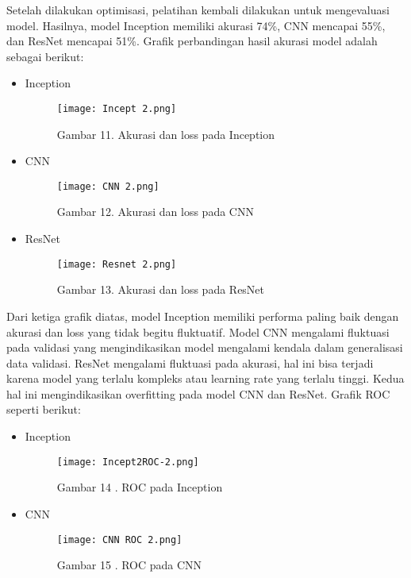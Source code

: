 \documentclass[12pt,a4paper]{article}
\begin{document}
Setelah dilakukan optimisasi, pelatihan kembali dilakukan untuk mengevaluasi model. Hasilnya, model Inception memiliki akurasi 74\%, CNN mencapai 55\%, dan ResNet mencapai 51\%. Grafik perbandingan hasil akurasi model adalah sebagai berikut:
\begin{itemize}
    \item Inception
    \begin{figure}[H]
        \centering
       \texttt{[image: Incept 2.png]}
        \caption*{Gambar 11. Akurasi dan loss pada Inception}
        \label{fig:enter-label}
    \end{figure}
\end{itemize}
\begin{itemize}
    \item CNN
    \begin{figure}[H]
        \centering
       \texttt{[image: CNN 2.png]}
        \caption*{Gambar 12. Akurasi dan loss pada CNN}
        \label{fig:enter-label}
    \end{figure}
\end{itemize}
\begin{itemize}
    \item ResNet
    \begin{figure}[H]
        \centering
       \texttt{[image: Resnet 2.png]}
        \caption*{Gambar 13. Akurasi dan loss pada ResNet}
        \label{fig:enter-label}
    \end{figure}
\end{itemize}
Dari ketiga grafik diatas, model Inception memiliki performa paling baik dengan akurasi dan loss yang tidak begitu fluktuatif. Model CNN mengalami fluktuasi pada validasi yang mengindikasikan model mengalami kendala dalam generalisasi data validasi. ResNet mengalami fluktuasi pada akurasi, hal ini bisa terjadi karena model yang terlalu kompleks atau learning rate yang terlalu tinggi. Kedua hal ini mengindikasikan overfitting pada model CNN dan ResNet.
Grafik ROC seperti berikut:
\begin{itemize}
    \item Inception
    \begin{figure}[H]
        \centering
       \texttt{[image: Incept2ROC-2.png]}
        \caption*{Gambar 14 . ROC  pada Inception}
        \label{fig:enter-label}
    \end{figure}
\end{itemize}
\begin{itemize}
    \item CNN
    \begin{figure}[H]
        \centering
       \texttt{[image: CNN ROC 2.png]}
        \caption*{Gambar 15 . ROC  pada CNN}
        \label{fig:enter-label}
    \end{figure}
\end{itemize}
\end{document}
